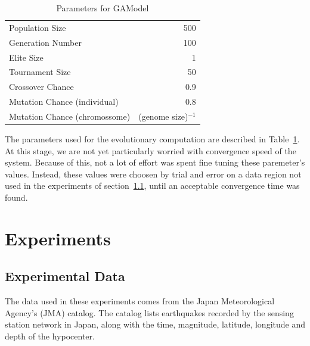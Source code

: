 \documentclass{sig-alternate}
\begin{document}
\begin{table}[!ht]
  \begin{center}
  \begin{tabular}{|l|r|}
    \hline
    Population Size & 500\\
    Generation Number & 100\\
    Elite Size & 1\\
    Tournament Size & 50\\
    Crossover Chance & 0.9\\
    Mutation Chance (individual) & 0.8\\
    Mutation Chance (chromossome) & (genome size)$^{-1}$\\
    \hline    
  \end{tabular}
  \end{center}
  \caption{Parameters for GAModel}
  \label{GAParameters}
\end{table}

The parameters used for the evolutionary computation are described in
Table~\ref{GAParameters}. At this stage, we are not yet particularly
worried with convergence speed of the system. Because of this, not a
lot of effort was spent fine tuning these paremeter's values. Instead,
these values were choosen by trial and error on a data region not used
in the experiments of section~\ref{data}, until an acceptable
convergence time was found.


\section{Experiments}

\subsection{Experimental Data}\label{data}

The data used in these experiments comes from the Japan Meteorological
Agency's (JMA) catalog. The catalog lists earthquakes recorded by the
sensing station network in Japan, along with the time, magnitude,
latitude, longitude and depth of the hypocenter.
\end{document}
